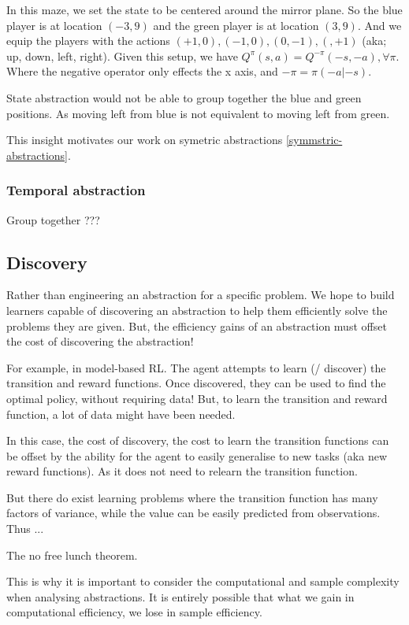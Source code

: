 In this maze, we set the state to be centered around the mirror plane.
So the blue player is at location $(-3, 9)$ and the green player is at location
$(3, 9)$. And we equip the players with the actions $(+1, 0), (-1, 0), (0, -1), (, +1)$ (aka; up, down, left, right).
Given this setup, we have $Q^{\pi}(s, a) = Q^{-\pi}(-s, -a), \forall \pi$. Where the negative
 operator only effects the x axis, and $-\pi = \pi(-a|-s)$.

State abstraction would not be able to group together the blue and green positions.
As moving left from blue is not equivalent to moving left from green.

This insight motivates our work on symetric abstractions \ref{symmstric-abstractions}.

\subsubsection{Temporal abstraction}

Group together ???

\subsection{Discovery}

Rather than engineering an abstraction for a specific problem.
We hope to build learners capable of discovering
an abstraction to help them efficiently solve the problems they are given.
But, the efficiency gains of an abstraction must offset the cost of discovering the abstraction! \cite{Konidaris2019}

For example, in model-based RL. The agent attempts to learn (/ discover) the
transition and reward functions. Once discovered, they can be used to find the optimal policy, without requiring data!
But, to learn the transition and reward function, a lot of data might have been needed.

In this case, the cost of discovery, the cost to learn the transition functions can be offset
by the ability for the agent to easily generalise to new tasks (aka new reward functions).
As it does not need to relearn the transition function.

But there do exist learning problems where the transition function has many
factors of variance, while the value can be easily predicted from observations.
Thus ...

The no free lunch theorem.

This is why it is important to consider the computational and sample complexity when analysing abstractions.
It is entirely possible that what we gain in computational efficiency, we lose in sample efficiency.

